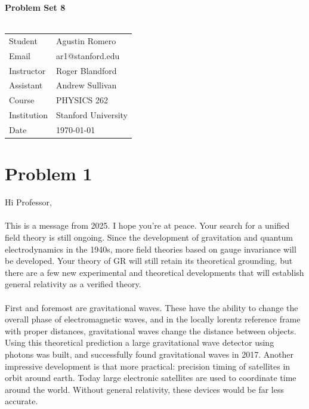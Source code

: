 \documentclass{article}
\begin{document}
\begin{center}
\textbf{\Large{Problem Set 8}}\\~\\
\begin{tabular}{l l}
Student&Agustin Romero\\
Email&ar1@stanford.edu\\
Instructor&Roger Blandford\\
Assistant&Andrew Sullivan\\
Course&PHYSICS 262\\
Institution&Stanford University\\
Date&\today\\
\end{tabular}
\end{center}
\section*{Problem 1}
Hi Professor,\\~\\
This is a message from 2025. I hope you're at peace. Your search for a unified field theory is still ongoing. Since the development of gravitation and quantum electrodynamics in the 1940s, more field theories based on gauge invariance will be developed. Your theory of GR will still retain its theoretical grounding, but there are a few new experimental and theoretical developments that will establish general relativity as a verified theory.\\~\\
First and foremost are gravitational waves. These have the ability to change the overall phase of electromagnetic waves, and in the locally lorentz reference frame with proper distances, gravitational waves change the distance between objects. Using this theoretical prediction a large gravitational wave detector using photons was built, and successfully found gravitational waves in 2017. Another impressive development is that more practical: precision timing of satellites in orbit around earth. Today large electronic satellites are used to coordinate time around the world. Without general relativity, these devices would be far less accurate. 
\end{document}
